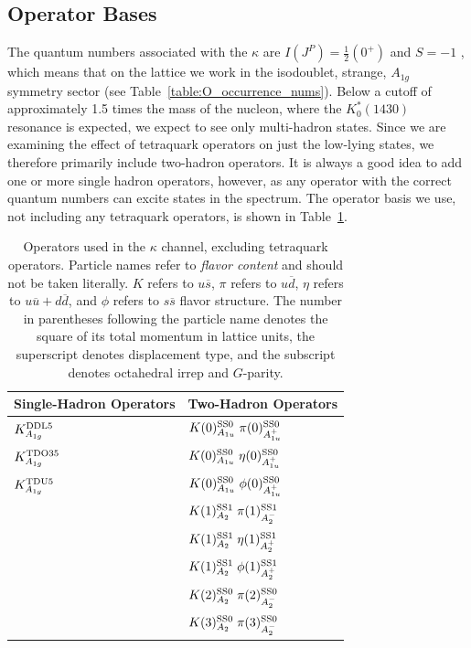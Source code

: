 \subsection{Operator Bases}
The quantum numbers associated with the $\kappa$ are $I(J^{P})=\frac{1}{2}(0^+)$ and $S=-1$ , which means that on the lattice we work in the isodoublet, strange, $A_{1g}$ symmetry sector (see Table~\ref{table:O_occurrence_nums}). Below a cutoff of approximately 1.5 times the mass of the nucleon, where the $K_0^*(1430)$ resonance is expected, we expect to see only multi-hadron states. Since we are examining the effect of tetraquark operators on just the low-lying states, we therefore primarily include two-hadron operators. It is always a good idea to add one or more single hadron operators, however, as any operator with the correct quantum numbers can excite states in the spectrum. The operator basis we use, not including any tetraquark operators, is shown in Table~\ref{table:kappa_ops_no_tq}.
\begin{table}
  \centering
  \begin{tabular}{l|l}
    \textbf{Single-Hadron Operators} & \textbf{Two-Hadron Operators}\\
    \hline
    $K^{\rm{DDL}5}_{A_{1g}}$ & $K(0)^{\rm{SS}0}_{A_{1u}}\; \pi(0)^{\rm{SS}0}_{A_{1u}^+}$\\
    $K^{\rm{TDO3}5}_{A_{1g}}$ & $K(0)^{\rm{SS}0}_{A_{1u}}\; \eta(0)^{\rm{SS}0}_{A_{1u}^+}$ \\
    $K^{\rm{TDU}5}_{A_{1g}}$ & $K(0)^{\rm{SS}0}_{A_{1u}}\; \phi(0)^{\rm{SS}0}_{A_{1u}^+}$ \\
    & $K(1)^{\rm{SS}1}_{A_2}\; \pi(1)^{\rm{SS}1}_{A_2^-}$ \\
    & $K(1)^{\rm{SS}1}_{A_2}\; \eta(1)^{\rm{SS}1}_{A_2^+}$ \\
    & $K(1)^{\rm{SS}1}_{A_2}\; \phi(1)^{\rm{SS}1}_{A_2^+}$ \\
    & $K(2)^{\rm{SS}0}_{A_2}\; \pi(2)^{\rm{SS}0}_{A_2^-}$ \\
    & $K(3)^{\rm{SS}0}_{A_2}\; \pi(3)^{\rm{SS}0}_{A_2^-}$
  \end{tabular}
  \caption{Operators used in the $\kappa$ channel, excluding tetraquark operators. Particle names refer to \emph{flavor content} and should not be taken literally. $K$ refers to $u\overline s$, $\pi$ refers to $u\overline d$, $\eta$ refers to $u\overline u + d\overline d$, and $\phi$ refers to $s\overline s$ flavor structure. The number in parentheses following the particle name denotes the square of its total momentum in lattice units, the superscript denotes displacement type, and the subscript denotes octahedral irrep and $G$-parity.}
  \label{table:kappa_ops_no_tq}
\end{table}

